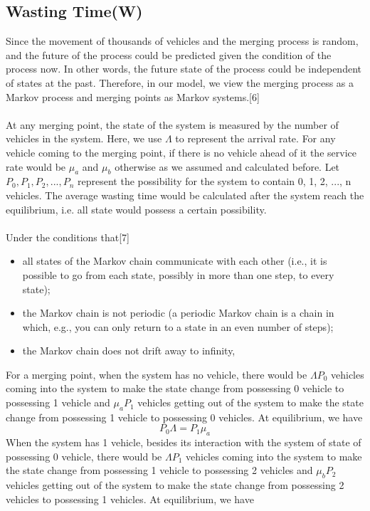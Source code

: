 \subsection{Wasting Time(W)}
Since the movement of thousands of vehicles and the merging process is random, and the future of the process could be predicted given the condition of the process now. In other words, the future state of the process could be independent of states at the past. Therefore, in our model, we view the merging process as a Markov process and merging points as Markov systems.[6]\\
\\
At any merging point, the state of the system is measured by the number of vehicles in the system. Here, we use $\Lambda$ to represent the arrival rate. For any vehicle coming to the merging point, if there is no vehicle ahead of it the service rate would be $\mu_{a}$ and $\mu_{b}$ otherwise as we assumed and calculated before. Let $P_{0}, P_{1}, P_{2}, ... , P_{n}$ represent the possibility for the system to contain 0, 1, 2, ..., n vehicles. The average wasting time would be calculated after the system reach the equilibrium, i.e. all state would possess a certain possibility.\\
\\
Under the conditions that[7]\\
\begin{itemize}
\item all states of the Markov chain communicate with each other (i.e., it is possible to go from each state, possibly in more than one step, to every state);
\item the Markov chain is not periodic (a periodic Markov chain is a chain in which, e.g., you can only return to a state in an even number of steps);
\item the Markov chain does not drift away to infinity,
\end{itemize}
For a merging point, when the system has no vehicle, there would be $\Lambda P_{0}$ vehicles coming into the system to make the state change from possessing 0 vehicle to possessing 1 vehicle and $\mu_{a} P_{1}$ vehicles getting out of the system to make the state change from possessing 1 vehicle to possessing 0 vehicles. At equilibrium, we have\\
\[
P_{0}\Lambda = P_{1} \mu_{a}
\]
When the system has 1 vehicle, besides its interaction with the system of state of possessing 0 vehicle, there would be $\Lambda P_{1}$ vehicles coming into the system to make the state change from possessing 1 vehicle to possessing 2 vehicles and $\mu_{b} P_{2}$ vehicles getting out of the system to make the state change from possessing 2 vehicles to possessing 1 vehicles. At equilibrium, we have\\
